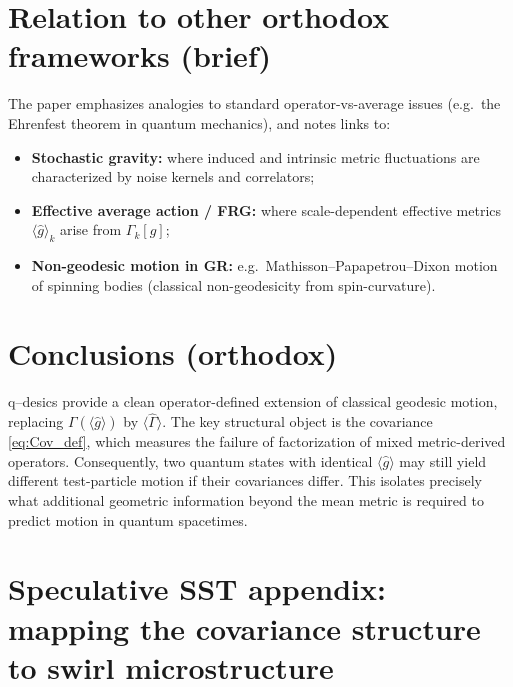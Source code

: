 \documentclass[11pt,a4paper]{article}
\theoremstyle{thmstyleone}
\theoremstyle{thmstyletwo}
\theoremstyle{thmstylethree}
\begin{document}
        \section{Relation to other orthodox frameworks (brief)}
        The paper emphasizes analogies to standard operator-vs-average issues (e.g.\ the Ehrenfest theorem in quantum mechanics),
        and notes links to:
        \begin{itemize}
            \item \textbf{Stochastic gravity:} where induced and intrinsic metric fluctuations are characterized by noise kernels and correlators;
            \item \textbf{Effective average action / FRG:} where scale-dependent effective metrics $\langle \hat g\rangle_k$ arise from $\Gamma_k[g]$;
            \item \textbf{Non-geodesic motion in GR:} e.g.\ Mathisson--Papapetrou--Dixon motion of spinning bodies (classical non-geodesicity from spin-curvature).
        \end{itemize}

        \section{Conclusions (orthodox)}
        q--desics provide a clean operator-defined extension of classical geodesic motion, replacing $\Gamma(\langle \hat g\rangle)$ by
        $\langle \hat\Gamma\rangle$. The key structural object is the covariance \eqref{eq:Cov_def}, which measures the failure of
        factorization of mixed metric-derived operators. Consequently, two quantum states with identical $\langle \hat g\rangle$
        may still yield different test-particle motion if their covariances differ. This isolates precisely what additional geometric
        information beyond the mean metric is required to predict motion in quantum spacetimes.

        \appendix
        \section{Speculative SST appendix: mapping the covariance structure to swirl microstructure}
\end{document}
